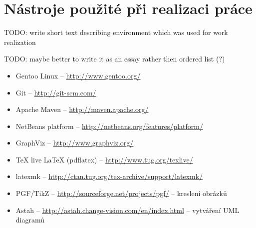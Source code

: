 \chapter{Nástroje použité při realizaci práce}
\noindent
TODO: write short text describing environment which was used for work realization

\noindent
TODO: maybe better to write it as an essay rather then ordered list (?)

\begin{itemize}
\item Gentoo Linux -- \href{http://www.gentoo.org/}{http://www.gentoo.org/}
\item Git -- \href{http://git-scm.com/}{http://git-scm.com/}
\item Apache Maven -- \href{http://maven.apache.org/}{http://maven.apache.org/}
\item NetBeans platform -- \href{http://netbeans.org/features/platform/}{http://netbeans.org/features/platform/}
\item GraphViz -- \href{http://www.graphviz.org/}{http://www.graphviz.org/}
\item TeX live \LaTeX{} (pdflatex) -- \href{http://www.tug.org/texlive/}{http://www.tug.org/texlive/}
\item latexmk -- \href{http://ctan.tug.org/tex-archive/support/latexmk/}{http://ctan.tug.org/tex-archive/support/latexmk/}
\item PGF/TikZ -- \href{http://sourceforge.net/projects/pgf/}{http://sourceforge.net/projects/pgf/} -- kreslení obrázků
\item Astah -- \href{http://astah.change-vision.com/en/index.html}{http://astah.change-vision.com/en/index.html} -- vytváření UML diagramů
\end{itemize}
